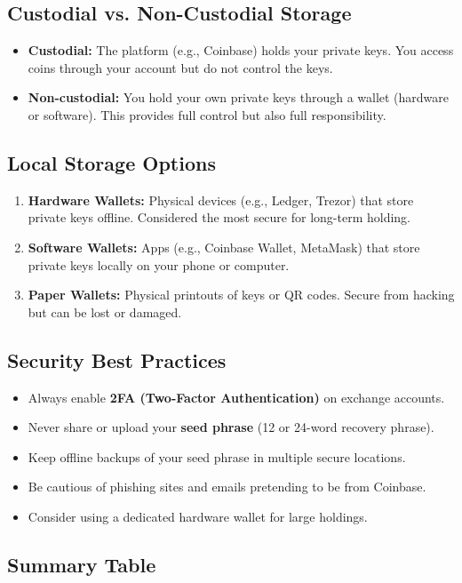 \documentclass{article}
\begin{document}
\subsection*{Custodial vs. Non-Custodial Storage}
\begin{itemize}
  \item \textbf{Custodial:} The platform (e.g., Coinbase) holds your private keys. You access coins through your account but do not control the keys.
  \item \textbf{Non-custodial:} You hold your own private keys through a wallet (hardware or software). This provides full control but also full responsibility.
\end{itemize}

\subsection*{Local Storage Options}
\begin{enumerate}
  \item \textbf{Hardware Wallets:} Physical devices (e.g., Ledger, Trezor) that store private keys offline. Considered the most secure for long-term holding.
  \item \textbf{Software Wallets:} Apps (e.g., Coinbase Wallet, MetaMask) that store private keys locally on your phone or computer.
  \item \textbf{Paper Wallets:} Physical printouts of keys or QR codes. Secure from hacking but can be lost or damaged.
\end{enumerate}

\subsection*{Security Best Practices}
\begin{itemize}
  \item Always enable \textbf{2FA (Two-Factor Authentication)} on exchange accounts.
  \item Never share or upload your \textbf{seed phrase} (12 or 24-word recovery phrase).
  \item Keep offline backups of your seed phrase in multiple secure locations.
  \item Be cautious of phishing sites and emails pretending to be from Coinbase.
  \item Consider using a dedicated hardware wallet for large holdings.
\end{itemize}

\subsection*{Summary Table}
\end{document}
